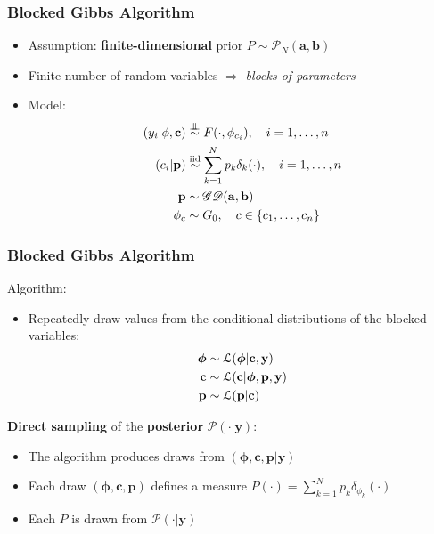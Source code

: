 \begin{frame}
	\frametitle{Blocked Gibbs Algorithm}
	\begin{itemize}
	    \item Assumption: \textbf{finite-dimensional} prior $P \sim  \mathscr{P}_{N}(\mathbf{a},\mathbf{b})$
        \item Finite number of random variables $\Rightarrow$ \textit{blocks of parameters}
        \item Model:
        \begin{align*}
            (y_{i}|\mathbf{\phi},\mathbf{c})&\indsim F(\cdot,\phi_{c_{i}}), \quad i=1,\dots,n \\
            (c_{i}|\mathbf{p})&\iidsim\sum\limits_{k=1}^N \mathit{p_{k}}\delta_{k}(\cdot), \quad i=1,\dots,n \\
            \mathbf{p} &\sim \mathscr{GD}(\mathbf{a},\mathbf{b}) \\
            \mathbf{\phi}_{c} & \sim G_{0}, \quad c \in \{c_1,\dots, c_n\}
        \end{align*}



	\end{itemize}
\end{frame}




\begin{frame}
	\frametitle{Blocked Gibbs Algorithm}
	Algorithm:
	\begin{itemize}
		\item Repeatedly draw values from the conditional distributions of the blocked variables:
		\begin{align*}
			\boldsymbol\phi &\sim \mathcal L(\boldsymbol\phi | \mathbf{c}, \mathbf{y}) \\
			\mathbf{c} &\sim \mathcal L (\mathbf{c}| \boldsymbol\phi,\mathbf{p}, \mathbf{y}) \\
			\mathbf{p} &\sim \mathcal L (\mathbf{p}| \mathbf{c})
		\end{align*}
	\end{itemize}
	\textbf{Direct sampling} of the \textbf{posterior} $\mathscr{P}(\cdot|\mathbf{y})$:
	\begin{itemize}
    	\item The algorithm produces draws from $(\boldsymbol\phi,\mathbf{c},\mathbf{p}| \mathbf{y})$
		\item Each draw $(\boldsymbol\phi,\mathbf{c},\mathbf{p})$ defines a measure $P(\cdot)= \sum\limits_{k=1}^N  \mathit{p_{k}}\delta_{\phi_{k}}(\cdot) $
		\item Each $P$ is drawn from $\mathscr{P}(\cdot|\mathbf{y})$
	\end{itemize}
\end{frame}

